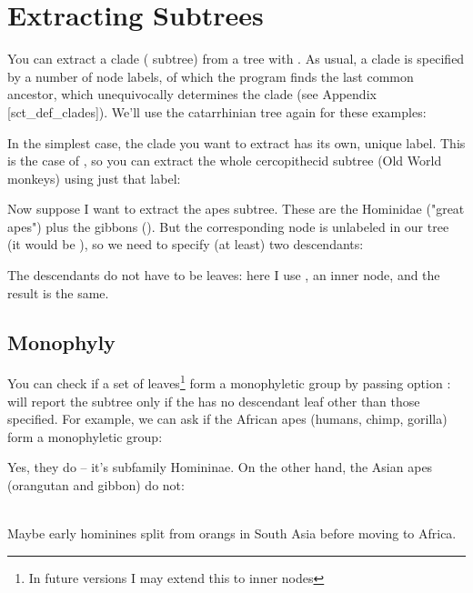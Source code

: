
\section[sct_subtrees]{Extracting Subtrees}

You can extract a clade ( subtree) from a tree with \clade. As
usual, a clade is specified by a number of node labels, of which the program
finds the last common ancestor, which unequivocally determines the clade (see
Appendix \in{}[sct_def_clades]).  We'll use the catarrhinian tree again for
these examples:


In the simplest case, the clade you want to extract has its own, unique label.
This is the case of , so you can extract the whole
cercopithecid subtree (Old World monkeys) using just that label:


Now suppose I want to extract the apes subtree. These are the Hominidae
("great apes") plus the gibbons (). But the corresponding
node is unlabeled in our tree (it would be ), so we need to specify (at least) two descendants:


\noindent{}The descendants do not have to be leaves: here I use , an inner node, and the result is the same.


\subsection{Monophyly}

You can check if a set of leaves\footnote{In future versions I may extend this
to inner nodes} form a monophyletic group by passing option :
\clade{} will report the subtree only if the \lca{} has no descendant leaf
other than those specified.  For example, we can ask if the African apes
(humans, chimp, gorilla) form a monophyletic group:


\noindent{}Yes, they do -- it's subfamily Homininae. On the other hand, the Asian apes (orangutan and gibbon) do not:

\type{[no output]} \\

\noindent{}Maybe early hominines split from orangs in South Asia before moving to Africa.

